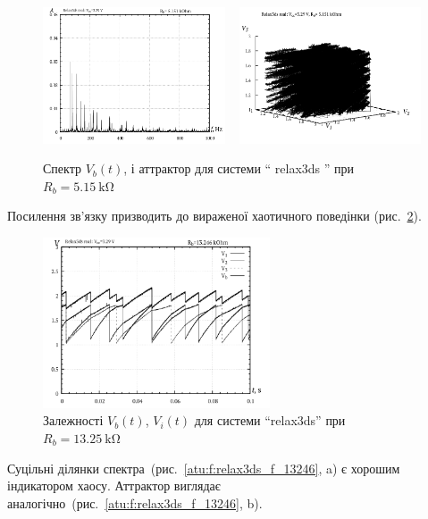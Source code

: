 \begin{figure}[htb!]
  \centerline{
    \includegraphics[width=0.48\textwidth]{p/relax3ds_f_005151.png}
    ~
    \includegraphics[width=0.48\textwidth]{p/relax3ds_v1v2v3_005151.png}
  }
\caption{Спектр $ V_b (t) $, і аттрактор для системи `` relax3ds '' при $ R_b = \SI{5.15}{\kilo \ohm} $}
\label{atu:f:relax3ds_f_05151}
\end{figure}

Посилення зв'язку призводить до вираженої хаотичного поведінки
(рис.~\ref{atu:f:relax3ds_t_13246}).

\begin{figure}[htb!]
  \centerline{\includegraphics[width=0.6\textwidth]{p/relax3ds_t_013246.png} }
  \caption{Залежності $V_b(t)$, $V_i(t)$ для системи ``relax3ds'' при $R_b = \SI{13.25}{\kilo\ohm} $}
  \label{atu:f:relax3ds_t_13246}
\end{figure}

Суцільні ділянки спектра~(рис.~\ref{atu:f:relax3ds_f_13246}, a)
є хорошим індикатором хаосу. Аттрактор виглядає
аналогічно~(рис.~\ref{atu:f:relax3ds_f_13246}, b).

